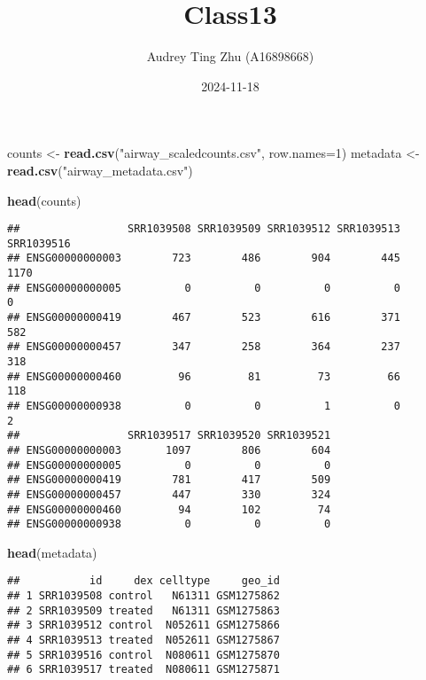 \documentclass[
]{article}
\title{Class13}
\author{Audrey Ting Zhu (A16898668)}
\date{2024-11-18}
\newenvironment{Shaded}{\begin{snugshade}}{\end{snugshade}}
\newcommand{\AttributeTok}[1]{\textcolor[rgb]{0.13,0.29,0.53}{#1}}
\newcommand{\DecValTok}[1]{\textcolor[rgb]{0.00,0.00,0.81}{#1}}
\newcommand{\FunctionTok}[1]{\textcolor[rgb]{0.13,0.29,0.53}{\textbf{#1}}}
\newcommand{\NormalTok}[1]{#1}
\newcommand{\OtherTok}[1]{\textcolor[rgb]{0.56,0.35,0.01}{#1}}
\newcommand{\StringTok}[1]{\textcolor[rgb]{0.31,0.60,0.02}{#1}}
\begin{document}
\maketitle

\begin{Shaded}
\begin{Highlighting}[]
\NormalTok{counts }\OtherTok{\textless{}{-}} \FunctionTok{read.csv}\NormalTok{(}\StringTok{"airway\_scaledcounts.csv"}\NormalTok{, }\AttributeTok{row.names=}\DecValTok{1}\NormalTok{)}
\NormalTok{metadata }\OtherTok{\textless{}{-}}\FunctionTok{read.csv}\NormalTok{(}\StringTok{"airway\_metadata.csv"}\NormalTok{)}
\end{Highlighting}
\end{Shaded}

\begin{Shaded}
\begin{Highlighting}[]
\FunctionTok{head}\NormalTok{(counts)}
\end{Highlighting}
\end{Shaded}

\begin{verbatim}
##                 SRR1039508 SRR1039509 SRR1039512 SRR1039513 SRR1039516
## ENSG00000000003        723        486        904        445       1170
## ENSG00000000005          0          0          0          0          0
## ENSG00000000419        467        523        616        371        582
## ENSG00000000457        347        258        364        237        318
## ENSG00000000460         96         81         73         66        118
## ENSG00000000938          0          0          1          0          2
##                 SRR1039517 SRR1039520 SRR1039521
## ENSG00000000003       1097        806        604
## ENSG00000000005          0          0          0
## ENSG00000000419        781        417        509
## ENSG00000000457        447        330        324
## ENSG00000000460         94        102         74
## ENSG00000000938          0          0          0
\end{verbatim}

\begin{Shaded}
\begin{Highlighting}[]
\FunctionTok{head}\NormalTok{(metadata)}
\end{Highlighting}
\end{Shaded}

\begin{verbatim}
##           id     dex celltype     geo_id
## 1 SRR1039508 control   N61311 GSM1275862
## 2 SRR1039509 treated   N61311 GSM1275863
## 3 SRR1039512 control  N052611 GSM1275866
## 4 SRR1039513 treated  N052611 GSM1275867
## 5 SRR1039516 control  N080611 GSM1275870
## 6 SRR1039517 treated  N080611 GSM1275871
\end{verbatim}
\end{document}
